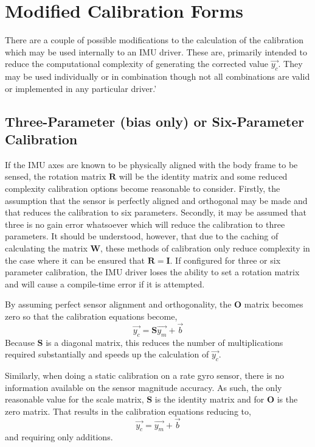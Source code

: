\documentclass[10pt,letterpaper]{memoir} %
\begin{document}
\section{Modified Calibration Forms}
There are a couple of possible modifications to the calculation of the calibration which may be used internally to an IMU driver.  These are, primarily intended to reduce the computational complexity of generating the corrected value $\vec{y_c}$.  They may be used individually or in combination though not all combinations are valid or implemented in any particular driver.'


   
\subsection{Three-Parameter (bias only) or Six-Parameter Calibration}
If the IMU axes are known to be physically aligned with the body frame to be sensed, the rotation matrix $\mathbf{R}$ will be the identity matrix and some reduced complexity calibration options become reasonable to consider.  Firstly, the assumption that the sensor is perfectly aligned and orthogonal may be made and that reduces the calibration to six parameters.  Secondly, it may be assumed that three is no gain error whatsoever which will reduce the calibration to three parameters.  It should be understood, however, that due to the caching of calculating the matrix $\mathbf{W}$, these methods of calibration only reduce complexity in the case where it can be ensured that $\mathbf{R} = \mathbf{I}$.  If configured for three or six parameter calibration, the IMU driver loses the ability to set a rotation matrix and will cause a compile-time error if it is attempted.

By assuming perfect sensor alignment and orthogonality, the $\mathbf{O}$ matrix becomes zero so that the calibration equations become,
\begin{equation}
	\vec{y_c} = \mathbf{S}\vec{y_m} + \vec{b}
\end{equation}
Because $\mathbf{S}$ is a diagonal matrix, this reduces the number of multiplications required substantially and speeds up the calculation of $\vec{y_c}$.

Similarly, when doing a static calibration on a rate gyro sensor, there is no information available on the sensor magnitude accuracy.  As such, the only reasonable value for the scale matrix, $\mathbf{S}$ is the identity matrix and for $\mathbf{O}$ is the zero matrix.  That results in the calibration equations reducing to,
\begin{equation}
\vec{y_c} = \vec{y_m} + \vec{b}
\end{equation}
and requiring only additions.
\end{document}
